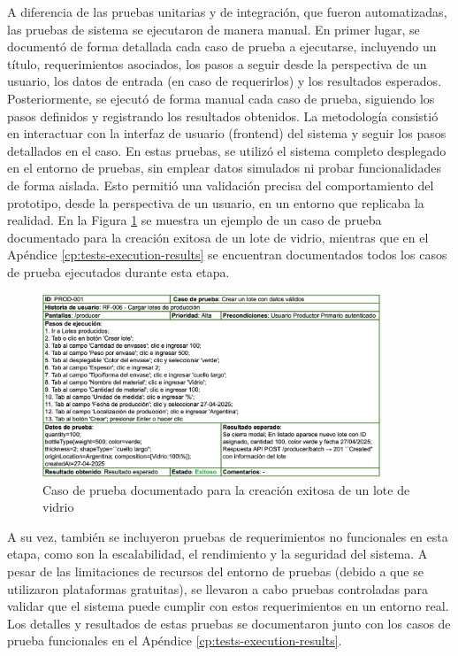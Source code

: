 A diferencia de las pruebas unitarias y de integración, que fueron automatizadas, las pruebas de sistema se ejecutaron de manera manual. En primer lugar, se documentó de forma detallada cada caso de prueba a ejecutarse, incluyendo un título, requerimientos asociados, los pasos a seguir desde la perspectiva de un usuario, los datos de entrada (en caso de requerirlos) y los resultados esperados. Posteriormente, se ejecutó de forma manual cada caso de prueba, siguiendo los pasos definidos y registrando los resultados obtenidos. La metodología consistió en interactuar con la interfaz de usuario (frontend) del sistema y seguir los pasos detallados en el caso. En estas pruebas, se utilizó el sistema completo desplegado en el entorno de pruebas, sin emplear datos simulados ni probar funcionalidades de forma aislada. Esto permitió una validación precisa del comportamiento del prototipo, desde la perspectiva de un usuario, en un entorno que replicaba la realidad. En la Figura \ref{fig:system-test-case-example} se muestra un ejemplo de un caso de prueba documentado para la creación exitosa de un lote de vidrio, mientras que en el Apéndice \ref{cp:tests-execution-results} se encuentran documentados todos los casos de prueba ejecutados durante esta etapa.

\begin{figure}[!tb]
	\centering
	\includegraphics[width=0.9\textwidth]{Figures/system-test-case-example.png}
	\caption{Caso de prueba documentado para la creación exitosa de un lote de vidrio}
	\label{fig:system-test-case-example}
\end{figure}

A su vez, también se incluyeron pruebas de requerimientos no funcionales en esta etapa, como son la escalabilidad, el rendimiento y la seguridad del sistema. A pesar de las limitaciones de recursos del entorno de pruebas (debido a que se utilizaron plataformas gratuitas), se llevaron a cabo pruebas controladas para validar que el sistema puede cumplir con estos requerimientos en un entorno real. Los detalles y resultados de estas pruebas se documentaron junto con los casos de prueba funcionales en el Apéndice \ref{cp:tests-execution-results}.

